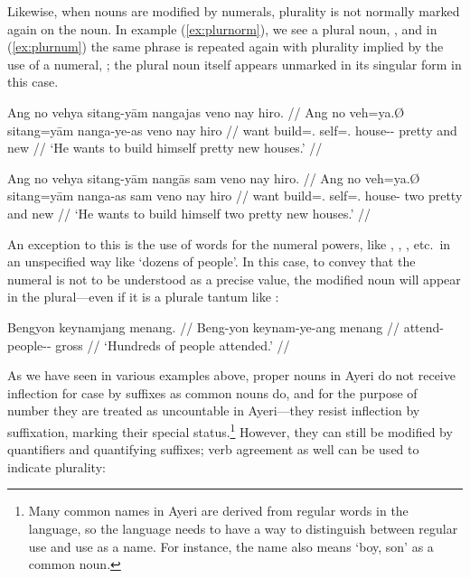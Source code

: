 \xe

Likewise, when nouns are modified by numerals, plurality is not
normally marked again on the noun. In example (\ref{ex:plurnorm}), we see a
plural noun, , and in (\ref{ex:plurnum}) the same phrase
is repeated again with plurality implied by the use of a numeral,
; the plural noun itself appears unmarked in its singular 
form in this case.

\pex
\a\label{ex:plurnorm}\begingl
	\gla Ang no vehya sitang-yām nangajas veno nay hiro. //
	\glb Ang no veh=ya.Ø sitang=yām nanga-ye-as veno nay hiro //
	\glc \AgtT{} want build=\TsgM.\Top{} self=\TsgM{}.\Dat{} 
		house-\Pl{}-\Parg{} pretty and new //
	\glft `He wants to build himself pretty new houses.' //
\endgl

\a\label{ex:plurnum}\begingl
	\gla Ang no vehya sitang-yām nangās sam veno nay hiro. //
	\glb Ang no veh=ya.Ø sitang=yām nanga-as sam veno nay hiro //
	\glc \AgtT{} want build=\TsgM.\Top{} self=\TsgM{}.\Dat{} house-\Parg{} 
		two pretty and new //
	\glft `He wants to build himself two pretty new houses.' //
\endgl

\xe

An exception to this is the use of words for the numeral powers, like
, ,
, etc.\ in an unspecified way like `dozens 
of people'. In this case, to convey that the numeral is not to be understood as
a precise value, the modified noun will appear in the plural---even if it is a
plurale tantum like :

\ex\begingl
	\gla Bengyon keynamjang menang. //
	\glb Beng-yon keynam-ye-ang menang //
	\glc attend-\TsgN{} people-\Pl{}-\Aarg{} gross //
	\glft `Hundreds of people attended.' //
\endgl\xe

%
As we have seen in various examples above, proper nouns in Ayeri do not 
receive inflection for case by suffixes as common nouns do, and for the 
purpose of number they are treated as uncountable in Ayeri---they resist 
inflection by suffixation, marking their special status.\footnote{Many common 
names in Ayeri are derived from regular words in the language, so the language 
needs to have a way to distinguish between regular use and use as a name. For 
instance, the name  also means `boy, son' as a common noun.} 
However, they can still be modified by quantifiers and quantifying suffixes; 
verb agreement as well can be used to indicate plurality:

